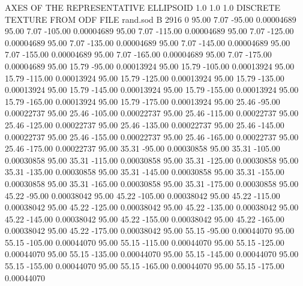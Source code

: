 AXES OF THE REPRESENTATIVE ELLIPSOID
    1.0   1.0   1.0
DISCRETE TEXTURE FROM ODF FILE  rand.sod                                
B    2916   0
     95.00      7.07    -95.00     0.00004689
     95.00      7.07   -105.00     0.00004689
     95.00      7.07   -115.00     0.00004689
     95.00      7.07   -125.00     0.00004689
     95.00      7.07   -135.00     0.00004689
     95.00      7.07   -145.00     0.00004689
     95.00      7.07   -155.00     0.00004689
     95.00      7.07   -165.00     0.00004689
     95.00      7.07   -175.00     0.00004689
     95.00     15.79    -95.00     0.00013924
     95.00     15.79   -105.00     0.00013924
     95.00     15.79   -115.00     0.00013924
     95.00     15.79   -125.00     0.00013924
     95.00     15.79   -135.00     0.00013924
     95.00     15.79   -145.00     0.00013924
     95.00     15.79   -155.00     0.00013924
     95.00     15.79   -165.00     0.00013924
     95.00     15.79   -175.00     0.00013924
     95.00     25.46    -95.00     0.00022737
     95.00     25.46   -105.00     0.00022737
     95.00     25.46   -115.00     0.00022737
     95.00     25.46   -125.00     0.00022737
     95.00     25.46   -135.00     0.00022737
     95.00     25.46   -145.00     0.00022737
     95.00     25.46   -155.00     0.00022737
     95.00     25.46   -165.00     0.00022737
     95.00     25.46   -175.00     0.00022737
     95.00     35.31    -95.00     0.00030858
     95.00     35.31   -105.00     0.00030858
     95.00     35.31   -115.00     0.00030858
     95.00     35.31   -125.00     0.00030858
     95.00     35.31   -135.00     0.00030858
     95.00     35.31   -145.00     0.00030858
     95.00     35.31   -155.00     0.00030858
     95.00     35.31   -165.00     0.00030858
     95.00     35.31   -175.00     0.00030858
     95.00     45.22    -95.00     0.00038042
     95.00     45.22   -105.00     0.00038042
     95.00     45.22   -115.00     0.00038042
     95.00     45.22   -125.00     0.00038042
     95.00     45.22   -135.00     0.00038042
     95.00     45.22   -145.00     0.00038042
     95.00     45.22   -155.00     0.00038042
     95.00     45.22   -165.00     0.00038042
     95.00     45.22   -175.00     0.00038042
     95.00     55.15    -95.00     0.00044070
     95.00     55.15   -105.00     0.00044070
     95.00     55.15   -115.00     0.00044070
     95.00     55.15   -125.00     0.00044070
     95.00     55.15   -135.00     0.00044070
     95.00     55.15   -145.00     0.00044070
     95.00     55.15   -155.00     0.00044070
     95.00     55.15   -165.00     0.00044070
     95.00     55.15   -175.00     0.00044070
